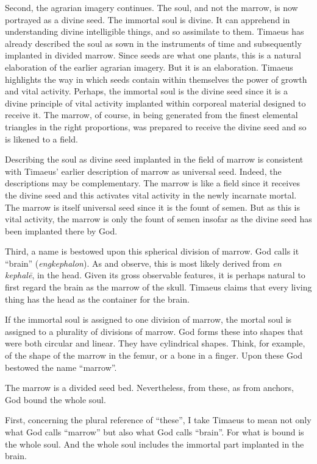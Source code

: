 Second, the agrarian imagery continues. The soul, and not the marrow, is now portrayed as a divine seed. The immortal soul is divine. It can apprehend in understanding divine intelligible things, and so assimilate to them. Timaeus has already described the soul as sown in the instruments of time and subsequently implanted in divided marrow. Since seeds are what one plants, this is a natural elaboration of the earlier agrarian imagery. But it is an elaboration. Timaeus highlights the way in which seeds contain within themselves the power of growth and vital activity. Perhaps, the immortal soul is the divine seed since it is a divine principle of vital activity implanted within corporeal material designed to receive it. The marrow, of course, in being generated from the finest elemental triangles in the right proportions, was prepared to receive the divine seed and so is likened to a field.

Describing the soul as divine seed implanted in the field of marrow is consistent with Timaeus' earlier description of marrow as universal seed. Indeed, the descriptions may be complementary. The marrow is like a field since it receives the divine seed and this activates vital activity in the newly incarnate mortal. The marrow is itself universal seed since it is the fount of semen. But as this is vital activity, the marrow is only the fount of semen insofar as the divine seed has been implanted there by God.

Third, a name is bestowed upon this spherical division of marrow. God calls it ``brain''  (\emph{engkephalon}). As \citet[77 n2]{Taylor:1929ov} and \citet[293 n3]{Cornford:1935fk} observe, this is most likely derived from \emph{en kephalē}, in the head. Given its gross observable features, it is perhaps natural to first regard the brain as the marrow of the skull. Timaeus claims that every living thing has the head as the container for the brain.

If the immortal soul is assigned to one division of marrow, the mortal soul is assigned to a plurality of divisions of marrow. God forms these into shapes that were both circular and linear. They have cylindrical shapes. Think, for example, of the shape of the marrow in the femur, or a bone in a finger. Upon these God bestowed the name ``marrow''.

The marrow is a divided seed bed. Nevertheless, from these, as from anchors, God bound the whole soul.

First, concerning the plural reference of ``these'', I take Timaeus to mean not only what God calls ``marrow'' but also what God calls ``brain''. For what is bound is the whole soul. And the whole soul includes the immortal part implanted in the brain.

